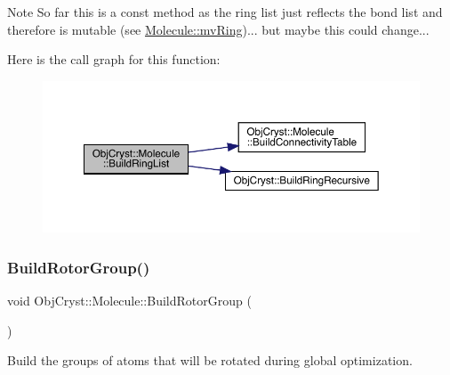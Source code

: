\begin{DoxyNote}{Note}
So far this is a const method as the ring list just reflects the bond list and therefore is mutable (see \mbox{\hyperlink{class_obj_cryst_1_1_molecule_a35cb61305129b6bbda4a0bb014b2c90e}{Molecule\+::mv\+Ring}})... but maybe this could change... 
\end{DoxyNote}
Here is the call graph for this function\+:
\nopagebreak
\begin{figure}[H]
\begin{center}
\leavevmode
\includegraphics[width=350pt]{class_obj_cryst_1_1_molecule_a9623bff2259d45c162ed28af73974f5a_cgraph}
\end{center}
\end{figure}
\mbox{\label{class_obj_cryst_1_1_molecule_a3642fa8104faa1ce84a977600f9d1aeb}} 
\subsubsection{\texorpdfstring{BuildRotorGroup()}{BuildRotorGroup()}}
{\footnotesize\ttfamily void Obj\+Cryst\+::\+Molecule\+::\+Build\+Rotor\+Group (\begin{DoxyParamCaption}{ }\end{DoxyParamCaption})}

Build the groups of atoms that will be rotated during global optimization.

